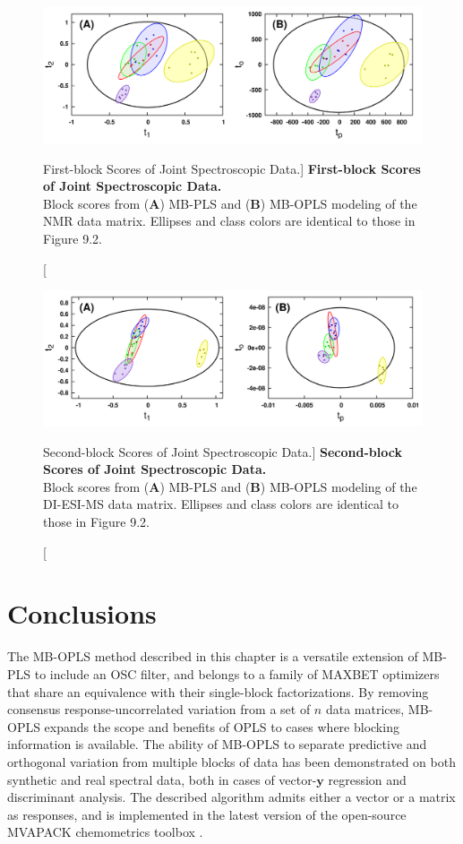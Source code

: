 \begin{figure}[ht!]
\includegraphics[width=6.5in]{figs/mbopls/04-blkscores-1.png}
\caption
      [First-block Scores of Joint Spectroscopic Data.]{
  {\bf First-block Scores of Joint Spectroscopic Data.}
  \\
  Block scores from ({\bf A}) MB-PLS and ({\bf B}) MB-OPLS modeling of the
  \hnmr{} NMR data matrix. Ellipses and class colors are identical to those
  in Figure 9.2.
}
\end{figure}

\begin{figure}[ht!]
\includegraphics[width=6.5in]{figs/mbopls/05-blkscores-2.png}
\caption
      [Second-block Scores of Joint Spectroscopic Data.]{
  {\bf Second-block Scores of Joint Spectroscopic Data.}
  \\
  Block scores from ({\bf A}) MB-PLS and ({\bf B}) MB-OPLS modeling of the
  DI-ESI-MS data matrix. Ellipses and class colors are identical to those
  in Figure 9.2.
}
\end{figure}

\section{Conclusions}

\begin{doublespace}
The MB-OPLS method described in this chapter is a versatile extension of
MB-PLS to include an OSC filter, and belongs to a family of MAXBET optimizers
that share an equivalence with their single-block factorizations. By removing
consensus response-uncorrelated variation from a set of $n$ data matrices,
MB-OPLS expands the scope and benefits of OPLS to cases where blocking
information is available. The ability of MB-OPLS to separate predictive and
orthogonal variation from multiple blocks of data has been demonstrated on
both synthetic and real spectral data, both in cases of vector-$\mathbf{y}$
regression and discriminant analysis. The described algorithm admits either
a vector or a matrix as responses, and is implemented in the latest version
of the open-source MVAPACK chemometrics toolbox \cite{worley:acscb2014}.
\end{doublespace}




